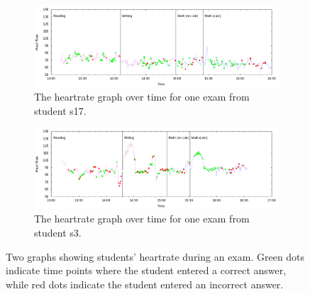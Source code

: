 \begin{figure}
    \begin{subfigure}{\columnwidth}
    \centering
    \includegraphics[width=1\columnwidth]{figs/images/graph_s17.png}
    \caption{The heartrate graph over time for one exam from student s17.}
    \label{fig:s17}
    \end{subfigure}
    
    \begin{subfigure}{\columnwidth}
    \centering
    \includegraphics[width=1\columnwidth]{figs/images/graph_s3.png}
    \caption{The heartrate graph over time for one exam from student s3.}
    \label{fig:s3}
    \end{subfigure}
    
    \caption{Two graphs showing students' heartrate during an exam. Green dots indicate time points where the student entered a correct answer, while red dots indicate the student entered an incorrect answer.}
    \label{fig:hearrate_graphs}
\end{figure}

